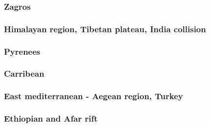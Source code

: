 \subsubsection*{Zagros}

\cite{vech06}
\cite{hamo10}
\cite{yakm11}
\cite{nipc13}
\cite{frba14}
\cite{ghbu14}
\cite{rugb17}

\subsubsection*{Himalayan region, Tibetan plateau, India collision} 

\cite{bird78}
\cite{moln89}
\cite{moem93}
\cite{wibe94}
\cite{chmm95}
\cite{robk97}
\cite{cblk00}\cite{clro00}
\cite{bejn01}\cite{laav01}\cite{zemk01}\cite{tzrm01}
\cite{kozc02}
\cite{reta03}
\cite{bejn04}
\cite{clbr05}
\cite{clrw06}
\cite{busc08}
\cite{hamo10}
\cite{care13}\cite{mutg13}\cite{chgz13}\cite{chgz13b}
\cite{whbb14}
\cite{bube17}
\cite{pirf18}
\cite{sccs19}

\subsubsection*{Pyrenees} 

\cite{giju98}
\cite{bemh00}
\cite{mcmg04}
\cite{jaml10}
\cite{fihv13b}
\cite{dual19}

\subsubsection*{Carribean} 

\subsubsection*{East mediterranean - Aegean region, Turkey} 

\cite{cazf10}

\subsubsection*{Ethiopian and Afar rift} 

\cite{mitk07}
\cite{cort08}
\cite{kekj09}
\cite{beve10}
\cite{phcs14}
\cite{brcr17}
\cite{brcg17}
\cite{cocf19}


